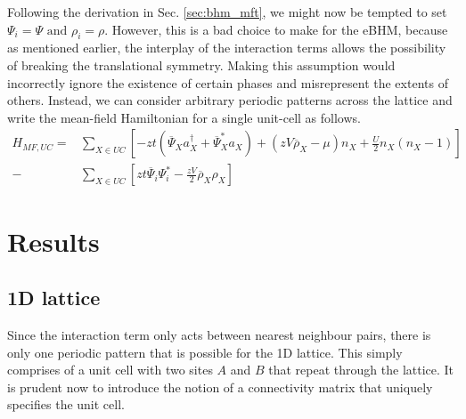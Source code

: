 Following the derivation in Sec. \ref{sec:bhm_mft}, we might now be tempted to set $\Psi_i = \Psi \text{ and } \rho_i = \rho$. However, this is a bad choice to make for the eBHM, because as mentioned earlier, the interplay of the interaction terms allows the possibility of breaking the translational symmetry. Making this assumption would incorrectly ignore the existence of certain phases and misrepresent the extents of others. Instead, we can consider arbitrary periodic patterns across the lattice and write the mean-field Hamiltonian for a single unit-cell\cite{Gheeraert2011} as follows.
\begin{align}\label{eq:ebhm_mft}
    H_{MF, UC} = &\sum_{X \in UC} \left [-zt(\overline{\Psi}_X a_X^{\dagger} + \overline{\Psi}_X^* a_X) + (zV\overline{\rho}_X - \mu)n_X + \frac{U}{2}n_X(n_X - 1)\right ] \nonumber\\
    - &\sum_{X \in UC} \left [zt\overline{\Psi}_i\Psi_i^* -  \frac{zV}{2} \overline{\rho}_X\rho_X \right ]
\end{align}


\section{Results}

\subsection{1D lattice}
Since the interaction term only acts between nearest neighbour pairs, there is only one periodic pattern that is possible for the 1D lattice. This simply comprises of a unit cell with two sites $A$ and $B$ that repeat through the lattice. It is prudent now to introduce the notion of a connectivity matrix that uniquely specifies the unit cell.

